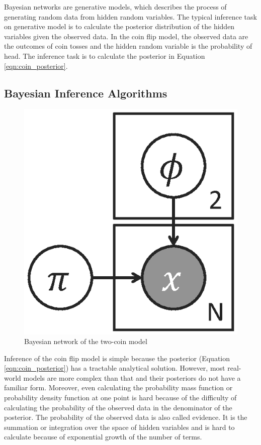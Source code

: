 Bayesian networks are generative models, which describes the process of
generating random data from hidden random variables. The typical inference
task on generative model is to calculate the posterior distribution of the
hidden variables given the observed data. In the coin flip model, the
observed data are the outcomes of coin tosses and the hidden random variable
is the probability of head. The inference task is to calculate the posterior
in Equation \ref{eqn:coin_posterior}.

\subsection{Bayesian Inference Algorithms}


\begin{figure}
	\centering
	\includegraphics[scale=0.4]{figs/two_coins.eps}
	\caption{Bayesian network of the two-coin model}
	\label{fig:two_coins}
\end{figure}

Inference of the coin flip model is simple because the posterior
(Equation \ref{eqn:coin_posterior})
 has a tractable analytical solution. 
However, most real-world models are more complex than that
and their posteriors do not have a familiar form. 
Moreover, even calculating the
probability mass function or probability density function at one point is hard
because of the difficulty of calculating the probability of the
observed data in the denominator of the posterior. The probability of the
observed data is also called evidence. It is the summation or integration over
the space of hidden variables and is hard to calculate because of exponential
growth of the number of terms. 

